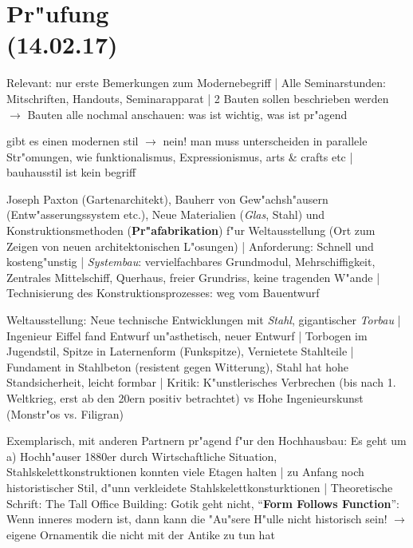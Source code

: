 \documentclass[emulatestandardclasses]{scrartcl}
\begin{document}
\section{Pr"ufung\\(14.02.17)}

Relevant: nur erste Bemerkungen zum Modernebegriff | 
Alle Seminarstunden: Mitschriften, Handouts, Seminarapparat | 
2 Bauten sollen beschrieben werden $\rightarrow$ Bauten alle nochmal anschauen: was ist wichtig, was ist pr"agend 

\begin{description}[leftmargin=!,labelwidth=\widthof{\bfseries P1}]
  \item[Baubeschreibung] 
  \item[Modernebegriff] gibt es einen modernen stil $\rightarrow$ nein! man muss unterscheiden in parallele Str"omungen, wie funktionalismus, Expressionismus, arts \& crafts etc | bauhausstil ist kein begriff
  \item[Crystal Palace] Joseph Paxton (Gartenarchitekt), Bauherr von Gew"achsh"ausern (Entw"asserungssystem etc.), Neue Materialien (\emph{Glas}, Stahl) und Konstruktionsmethoden (\textbf{Pr"afabrikation}) f"ur Weltausstellung (Ort zum Zeigen von neuen architektonischen L"osungen) | Anforderung: Schnell und kosteng"unstig | \emph{Systembau}: vervielfachbares Grundmodul, Mehrschiffigkeit, Zentrales Mittelschiff, Querhaus, freier Grundriss, keine tragenden W"ande | Technisierung des Konstruktionsprozesses: weg vom Bauentwurf
  \item[Eiffelturm] Weltausstellung: Neue technische Entwicklungen mit \emph{Stahl}, gigantischer \emph{Torbau} | Ingenieur Eiffel fand Entwurf un"asthetisch, neuer Entwurf | Torbogen im Jugendstil, Spitze in Laternenform (Funkspitze), Vernietete Stahlteile | Fundament in Stahlbeton (resistent gegen Witterung), Stahl hat hohe Standsicherheit, leicht formbar | Kritik: K"unstlerisches Verbrechen (bis nach 1. Weltkrieg, erst ab den 20ern positiv betrachtet) vs Hohe Ingenieurskunst (Monstr"os vs. Filigran)
  \item[Louis Sullivan] Exemplarisch, mit anderen Partnern pr"agend f"ur den Hochhausbau: Es geht um a) Hochh"auser 1880er durch Wirtschaftliche Situation, Stahlskelettkonstruktionen konnten viele Etagen halten | zu Anfang noch historistischer Stil, d"unn verkleidete Stahlskelettkonsturktionen | Theoretische Schrift: The Tall Office Building: Gotik geht nicht, "`\textbf{Form Follows Function}"': Wenn inneres modern ist, dann kann die "Au"sere H"ulle nicht historisch sein! $\rightarrow$ eigene Ornamentik die nicht mit der Antike zu tun hat

\end{description}
\end{document}
